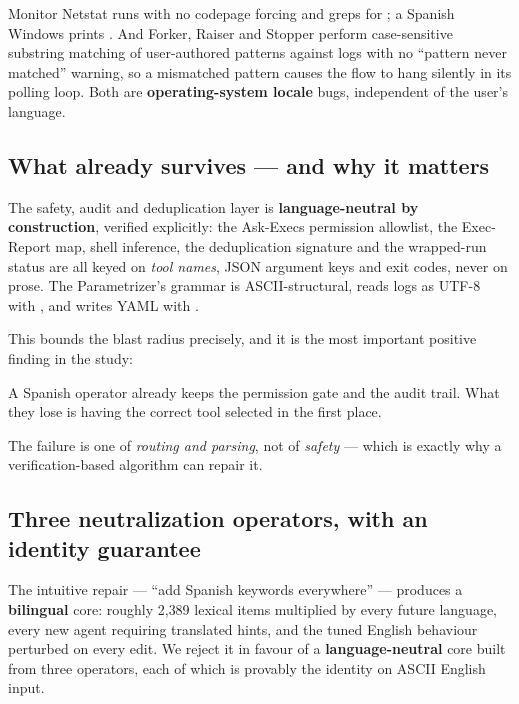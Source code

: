 Monitor Netstat runs  with no codepage forcing and greps for
; a Spanish Windows prints \textbf{}. And
Forker, Raiser and Stopper perform case-sensitive substring matching of
user-authored patterns against logs with no ``pattern never matched'' warning, so
a mismatched pattern causes the flow to hang silently in its polling loop. Both
are \textbf{operating-system locale} bugs, independent of the user's language.

\subsection{What already survives --- and why it matters}
\label{sec:what-survives}

The safety, audit and deduplication layer is \textbf{language-neutral by
construction}, verified explicitly: the Ask-Execs permission allowlist, the
Exec-Report map, shell inference, the deduplication signature and the wrapped-run
status are all keyed on \emph{tool names}, JSON argument keys and exit codes,
never on prose. The Parametrizer's  grammar is
ASCII-structural, reads logs as UTF-8 with , and writes
YAML with .

This bounds the blast radius precisely, and it is the most important positive
finding in the study:

\begin{keyinsight}
A Spanish operator already keeps the permission gate and the audit trail. What
they lose is having the correct tool selected in the first place.
\end{keyinsight}

The failure is one of \emph{routing and parsing}, not of \emph{safety} --- which
is exactly why a verification-based algorithm can repair it.

\subsection{Three neutralization operators, with an identity guarantee}
\label{sec:neutralization-operators}

The intuitive repair --- ``add Spanish keywords everywhere'' --- produces a
\textbf{bilingual} core: roughly 2{,}389 lexical items multiplied by every future
language, every new agent requiring translated hints, and the tuned English
behaviour perturbed on every edit. We reject it in favour of a
\textbf{language-neutral} core built from three operators, each of which is
provably the identity on ASCII English input.

